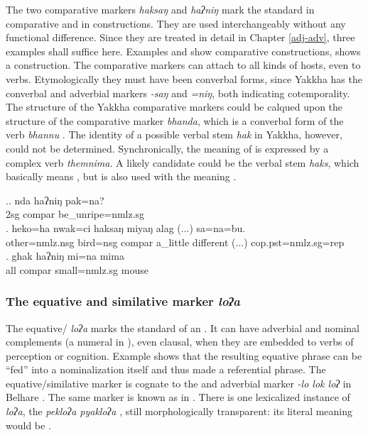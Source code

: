   The two comparative markers \emph{haksaŋ} and \emph{haʔniŋ} mark the standard in comparative and in  constructions. They are used interchangeably without any functional difference. Since they are treated in detail in Chapter \ref{adj-adv}, three examples shall suffice here. Examples \Next[a] and \Next[b] show comparative constructions, \Next[c] shows a  construction. The comparative markers can attach to all kinds of hosts, even to verbs. Etymologically they must have been converbal forms, since Yakkha has the converbal and adverbial  markers \mbox{\emph{-saŋ}} and \mbox{\emph{=niŋ}}, both indicating cotemporality. The structure of the Yakkha comparative markers could be calqued upon the structure of the  comparative marker \emph{bhanda}, which is a converbal form of the verb \emph{bhannu} . The identity of a possible verbal stem \emph{hak} in Yakkha, however, could not be determined. Synchronically, the meaning of  is expressed by a complex verb \emph{themnima}. A likely candidate could be the verbal stem \emph{haks}, which basically means , but is also used with the meaning .
  
  
\ex.\ag. nda haʔniŋ pak=na?\\
		2{\sc sg}  {\sc compar}	be\_unripe{\sc =nmlz.sg}\\
\bg. heko=ha nwak=ci haksaŋ miyaŋ alag (...) sa=na=bu.\\
	other{\sc =nmlz.nsg} bird{\sc =nsg} {\sc compar}  a\_little different (...) {\sc cop.pst=nmlz.sg=rep}\\
	 
\bg. ghak haʔniŋ mi=na  mima\\
	all {\sc compar} small{\sc =nmlz.sg} mouse\\
 
  

\subsubsection{The equative and similative marker \emph{loʔa}}
  
  The equative/  \emph{loʔa} marks the standard of an . It can have adverbial \Next[a] and nominal  complements  (a numeral in \Next[b]), even clausal, when they are embedded to verbs of perception or cognition. Example \Next[c] shows that the resulting equative phrase  can be “fed”  into a nominalization itself and thus made a referential phrase. The equative/similative marker is cognate to the  and adverbial  marker \emph{-lo \ti lok \ti loʔ} in Belhare  \citep{Bickel1993Belhare}. The same marker is known as  in   \citep{Doornenbal2009A-grammar}.  There is one lexicalized instance of  \emph{loʔa}, the   \emph{pekloʔa \ti pyakloʔa} , still morphologically transparent: its literal meaning would be .
 
